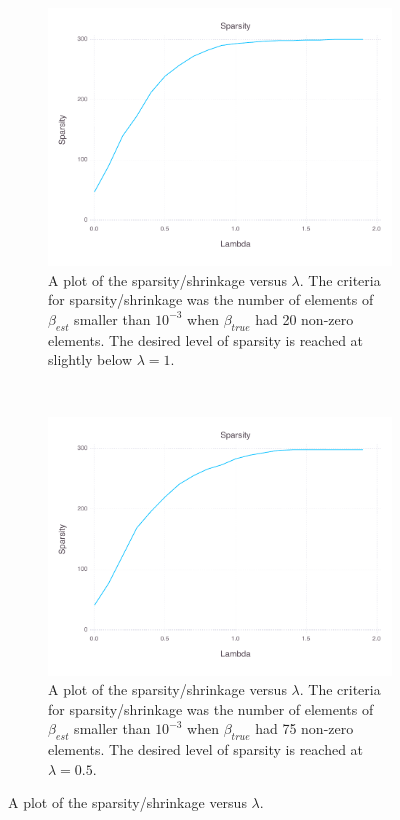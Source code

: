 \documentclass[12pt, leqno]{article}
\begin{document}
\begin{figure}
\centering 
\begin{subfigure}[b]{0.5\textwidth}
  \includegraphics[width=\textwidth]{sparsityplotcount-20.pdf}
  \caption{A plot of the sparsity/shrinkage versus $\lambda$. The criteria for
    sparsity/shrinkage was the number of elements of $\beta_{est}$
    smaller than $10^{-3}$ when $\beta_{true}$ had 20 non-zero
    elements. The desired level of sparsity is reached at slightly
    below $\lambda = 1$.}
\label{fig:sparse20}
\end{subfigure}\\
\begin{subfigure}[b]{0.5\textwidth}
  \includegraphics [width=\textwidth]{sparsityplotcount-75.pdf}
  \caption{A plot of the sparsity/shrinkage versus $\lambda$. The criteria for
    sparsity/shrinkage was the number of elements of $\beta_{est}$
    smaller than $10^{-3}$ when $\beta_{true}$ had 75 non-zero
    elements. The desired level of sparsity is reached at $\lambda = 0.5$.}
\label{fig:sparse75}
\end{subfigure}
        \caption{A plot of the sparsity/shrinkage versus $\lambda$. }\label{fig:sparse}
\end{figure}
\end{document}
